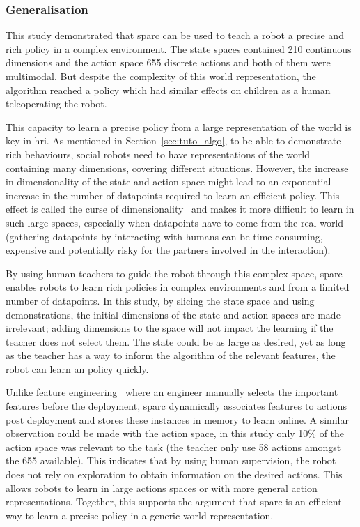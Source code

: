 \subsubsection{Generalisation}


This study demonstrated that \gls{sparc} can be used to teach a robot a precise and rich policy in a complex environment. The state spaces contained 210 continuous dimensions and the action space 655 discrete actions and both of them were multimodal. But despite the complexity of this world representation, the algorithm reached a policy which had similar effects on children as a human teleoperating the robot. 

This capacity to learn a precise policy from a large representation of the world is key in \gls{hri}. As mentioned in Section~\ref{sec:tuto_algo}, to be able to demonstrate rich behaviours, social robots need to have representations of the world containing many dimensions, covering different situations. However, the increase in dimensionality of the state and action space might lead to an exponential increase in the number of datapoints required to learn an efficient policy. This effect is called the curse of dimensionality~\citep{bellman1957dynamic} and makes it more difficult to learn in such large spaces, especially when datapoints have to come from the real world (gathering datapoints by interacting with humans can be time consuming, expensive and potentially risky for the partners involved in the interaction).

By using human teachers to guide the robot through this complex space, \gls{sparc} enables robots to learn rich policies in complex environments and from a limited number of datapoints. In this study, by slicing the state space and using demonstrations, the initial dimensions of the state and action spaces are made irrelevant; adding dimensions to the space will not impact the learning if the teacher does not select them. The state could be as large as desired, yet as long as the teacher has a way to inform the algorithm of the relevant features, the robot can learn an policy quickly. 

Unlike feature engineering~\citep{domingos2012few} where an engineer manually selects the important features before the deployment, \gls{sparc} dynamically associates features to actions post deployment and stores these instances in memory to learn online. A similar observation could be made with the action space, in this study only 10\% of the action space was relevant to the task (the teacher only use 58 actions amongst the 655 available). This indicates that by using human supervision, the robot does not rely on exploration to obtain information on the desired actions. This allows robots to learn in large actions spaces or with more general action representations. Together, this supports the argument that \gls{sparc} is an efficient way to learn a precise policy in a generic world representation.

